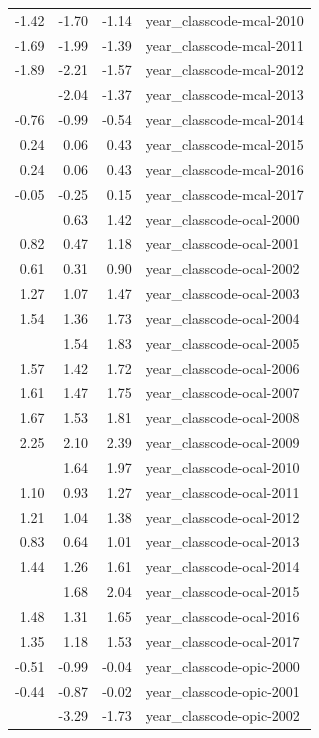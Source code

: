 \documentclass[]{article}
\begin{document}
\begin{longtable}[t]{rrrl}
-1.42 & -1.70 & -1.14 & year\_classcode-mcal-2010\\
-1.69 & -1.99 & -1.39 & year\_classcode-mcal-2011\\
-1.89 & -2.21 & -1.57 & year\_classcode-mcal-2012\\
\addlinespace
-1.70 & -2.04 & -1.37 & year\_classcode-mcal-2013\\
-0.76 & -0.99 & -0.54 & year\_classcode-mcal-2014\\
0.24 & 0.06 & 0.43 & year\_classcode-mcal-2015\\
0.24 & 0.06 & 0.43 & year\_classcode-mcal-2016\\
-0.05 & -0.25 & 0.15 & year\_classcode-mcal-2017\\
\addlinespace
1.02 & 0.63 & 1.42 & year\_classcode-ocal-2000\\
0.82 & 0.47 & 1.18 & year\_classcode-ocal-2001\\
0.61 & 0.31 & 0.90 & year\_classcode-ocal-2002\\
1.27 & 1.07 & 1.47 & year\_classcode-ocal-2003\\
1.54 & 1.36 & 1.73 & year\_classcode-ocal-2004\\
\addlinespace
1.69 & 1.54 & 1.83 & year\_classcode-ocal-2005\\
1.57 & 1.42 & 1.72 & year\_classcode-ocal-2006\\
1.61 & 1.47 & 1.75 & year\_classcode-ocal-2007\\
1.67 & 1.53 & 1.81 & year\_classcode-ocal-2008\\
2.25 & 2.10 & 2.39 & year\_classcode-ocal-2009\\
\addlinespace
1.81 & 1.64 & 1.97 & year\_classcode-ocal-2010\\
1.10 & 0.93 & 1.27 & year\_classcode-ocal-2011\\
1.21 & 1.04 & 1.38 & year\_classcode-ocal-2012\\
0.83 & 0.64 & 1.01 & year\_classcode-ocal-2013\\
1.44 & 1.26 & 1.61 & year\_classcode-ocal-2014\\
\addlinespace
1.86 & 1.68 & 2.04 & year\_classcode-ocal-2015\\
1.48 & 1.31 & 1.65 & year\_classcode-ocal-2016\\
1.35 & 1.18 & 1.53 & year\_classcode-ocal-2017\\
-0.51 & -0.99 & -0.04 & year\_classcode-opic-2000\\
-0.44 & -0.87 & -0.02 & year\_classcode-opic-2001\\
\addlinespace
-2.51 & -3.29 & -1.73 & year\_classcode-opic-2002\\

\end{longtable}
\end{document}
